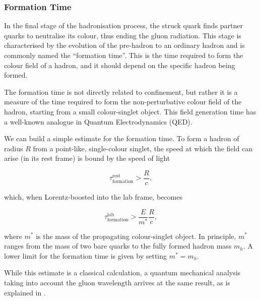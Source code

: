 \subsubsection{Formation Time}
\label{sssec::formation_time}
    In the final stage of the hadronisation process, the struck quark finds partner quarks to neutralise its colour, thus ending the gluon radiation.
    This stage is characterised by the evolution of the pre-hadron to an ordinary hadron and is commonly named the ``formation time''.
    This is the time required to form the colour field of a hadron, and it should depend on the specific hadron being formed.

    The formation time is not directly related to confinement, but rather it is a measure of the time required to form the non-perturbative colour field of the hadron, starting from a small colour-singlet object.
    This field generation time has a well-known analogue in Quantum Electrodynamics (QED).

    We can build a simple estimate for the formation time.
    To form a hadron of radius $R$ from a point-like, single-colour singlet, the speed at which the field can arise (in its rest frame) is bound by the speed of light

    \begin{equation*}
        \tau^\text{rest}_\text{formation} > \frac{R}{c},
    \end{equation*}

    which, when Lorentz-boosted into the lab frame, becomes

    \begin{equation*}
        \tau^\text{lab}_\text{formation} > \frac{E}{m^*} \frac{R}{c},
    \end{equation*}

    where $m^*$ is the mass of the propagating colour-singlet object.
    In principle, $m^*$ ranges from the mass of two bare quarks to the fully formed hadron mass $m_h$.
    A lower limit for the formation time is given by setting $m^* = m_h$.

    While this estimate is a classical calculation, a quantum mechanical analysis taking into account the gluon wavelength arrives at the same result, as is explained in \cite{dokshitzer1991}.

